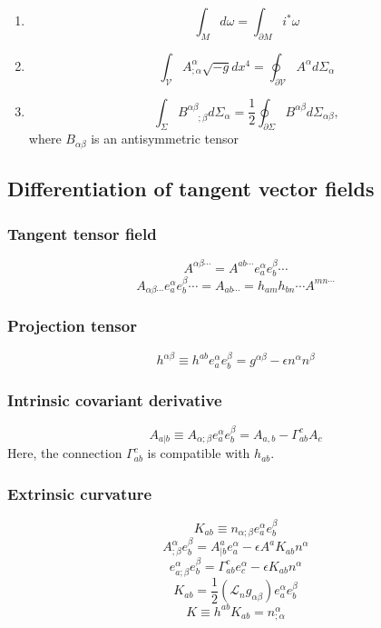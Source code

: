 \begin{newthem}
\begin{enumerate}
\item \[\int_{M} d\omega = \int_{\partial M} i^* \omega\]
\item \[\int_{\mathcal{V}} A^{\alpha}_{;\alpha} \sqrt{-g} dx^4 = \oint_{\partial \mathcal{V}} A^{\alpha} d\Sigma_{\alpha}\]
\item \[\int_{\Sigma} B^{\alpha \beta}_{\phantom{\alpha \beta};\beta} d\Sigma_{\alpha} = \frac{1}{2}\oint_{\partial \Sigma} B^{\alpha \beta} d\Sigma_{\alpha \beta},\]
where $B_{\alpha \beta}$ is an antisymmetric tensor
\end{enumerate}
\end{newthem}

\subsection{Differentiation of tangent vector fields}
\subsubsection{Tangent tensor field}
\[A^{\alpha \beta \cdots} = A^{ab\cdots} e_a^{\alpha} e_b^{\beta} \cdots\]
\[A_{\alpha \beta \cdots} e_a^{\alpha} e_b^{\beta} \cdots = A_{ab\cdots} = h_{am} h_{bn} \cdots A^{mn\cdots}\]
\subsubsection{Projection tensor}
\[h^{\alpha \beta} \equiv h^{ab}e_a^{\alpha} e_b^{\beta} = g^{\alpha \beta} - \epsilon n^{\alpha} n^{\beta}\]
\subsubsection{Intrinsic covariant derivative}
\[A_{a|b} \equiv A_{\alpha;\beta} e_a^{\alpha} e_b^{\beta} = A_{a,b} - \Gamma^c_{ab}A_c\]
Here, the connection $\Gamma^c_{ab}$ is compatible with $h_{ab}$.
\subsubsection{Extrinsic curvature}
\[K_{ab} \equiv n_{\alpha;\beta}e_a^{\alpha} e_b^{\beta}\]
\[A^{\alpha}_{;\beta} e_b^{\beta} = A^a_{|b} e_a^{\alpha} - \epsilon A^a K_{ab}n^{\alpha}\]
\[e^{\alpha}_{a;\beta} e_b^{\beta} = \Gamma^c_{ab}e_c^{\alpha} - \epsilon K_{ab}n^{\alpha}\]
\[K_{ab} = \frac{1}{2}(\mathcal{L}_n g_{\alpha \beta})e_a^{\alpha} e_b^{\beta}\]
\[K \equiv h^{ab}K_{ab} = n^{\alpha}_{;\alpha}\]

